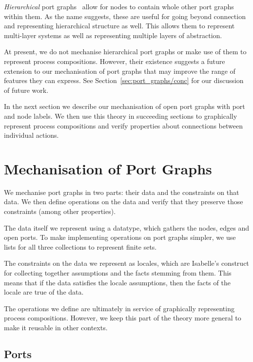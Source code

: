\documentclass[class=smolathesis,crop=false]{standalone}
\begin{document}
\emph{Hierarchical} port graphs~\cite{ene_et_al-2018} allow for nodes to contain whole other port graphs within them.
As the name suggests, these are useful for going beyond connection and representing hierarchical structure as well.
This allows them to represent multi-layer systems as well as representing multiple layers of abstraction.

At present, we do not mechanise hierarchical port graphs or make use of them to represent process compositions.
However, their existence suggests a future extension to our mechanisation of port graphs that may improve the range of features they can express.
See Section~\ref{sec:port_graphs/conc} for our discussion of future work.

In the next section we describe our mechanisation of open port graphs with port and node labels.
We then use this theory in succeeding sections to graphically represent process compositions and verify properties about connections between individual actions.

\section{Mechanisation of Port Graphs}
\label{sec:port_graphs/mech}

We mechanise port graphs in two parts: their data and the constraints on that data.
We then define operations on the data and verify that they preserve those constraints (among other properties).

The data itself we represent using a datatype, which gathers the nodes, edges and open ports.
To make implementing operations on port graphs simpler, we use lists for all three collections to represent finite sets.

The constraints on the data we represent as locales, which are Isabelle's construct for collecting together assumptions and the facts stemming from them.
This means that if the data satisfies the locale assumptions, then the facts of the locale are true of the data.

The operations we define are ultimately in service of graphically representing process compositions.
However, we keep this part of the theory more general to make it reusable in other contexts.

\subsection{Ports}
\label{sec:port_graphs/mech/ports}
\end{document}
